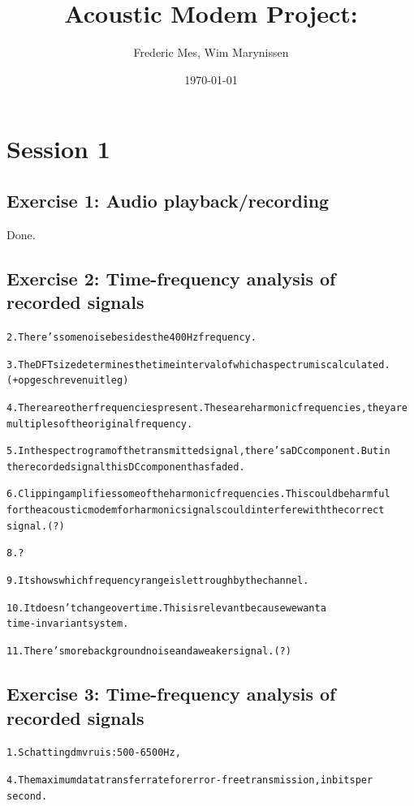 \documentclass[a4paper,11pt]{article}
\title{ Acoustic Modem Project:}
\author{Frederic Mes, Wim Marynissen}
\date{\today}
\begin{document}
\maketitle
\section{Session 1}
\subsection{Exercise 1: Audio playback/recording}
Done.


\subsection{Exercise 2: Time-frequency analysis of recorded signals}
\begin{alltt}
	2.	There's some noise besides the 400Hz frequency.
	
	3.	The DFT size determines the time interval of which a spectrum is calculated.
		(+ opgeschreven uitleg)
		
	4.	There are other frequencies present. These are harmonic frequencies, they are
	multiples of the original frequency.
	
	5.	In the spectrogram of the transmitted signal, there's a DC component. But in
	the recorded signal this DC component has faded. 
	
	6.	Clipping amplifies some of the harmonic frequencies. This could be harmful
	for the acoustic modem for harmonic signals could interfere with the correct
	signal. (?)
	
	8.	?
	
	9. It shows which frequency range is let trough by the channel.
	
	10. It doesn't change over time. This is relevant because we want a
	time-invariant system.
	
	11. There's more background noise and a weaker signal. (?)
\end{alltt}

\subsection{Exercise 3: Time-frequency analysis of recorded signals}
\begin{alltt}
1. Schatting dmv ruis: 500-6500 Hz,

4. The maximum data transfer rate for error-free transmission, in bits per
second.
\end{alltt}
\end{document}
